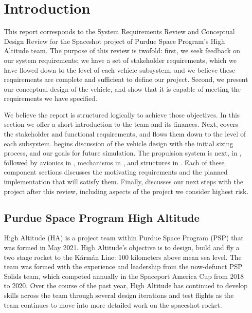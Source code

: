 \section{Introduction} \label{section:introduction}
This report corresponds to the System Requirements Review and Conceptual Design Review for the Spaceshot project of Purdue Space Program's High Altitude team. The purpose of this review is twofold: first, we seek feedback on our system requirements; we have a set of stakeholder requirements, which we have flowed down to the level of each vehicle subsystem,  and we believe these requirements are complete and sufficient to define our project. Second, we present our conceptual design of the vehicle, and show that it is capable of meeting the requirements we have specified.

We believe the report is structured logically to achieve those objectives. In this section we offer a short introduction to the team and its finances. Next,  covers the stakeholder and functional requirements, and flows them down to the level of each subsystem.  begins discussion of the vehicle design with the initial sizing process, and our goals for future simulation. The propulsion system is next, in , followed by avionics in , mechanisms in , and structures in . Each of these component sections discusses the motivating requirements and the planned implementation that will satisfy them. Finally,  discusses our next steps with the project after this review, including aspects of the project we consider highest risk.

\subsection{Purdue Space Program High Altitude}
High Altitude (HA) is a project team within Purdue Space Program (PSP) that was formed in May 2021. High Altitude's objective is to design, build and fly a two stage rocket to the K\'{a}rm\'{a}n Line: 100 kilometers above mean sea level. The team was formed with the experience and leadership from the now-defunct PSP Solids team, which competed annually in the Spaceport America Cup from 2018 to 2020. Over the course of the past year, High Altitude has continued to develop skills across the team through several design iterations and test flights as the team continues to move into more detailed work on the spaceshot rocket.

